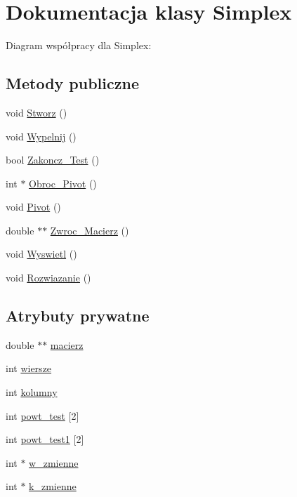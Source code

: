 \hypertarget{class_simplex}{\section{\-Dokumentacja klasy \-Simplex}
\label{class_simplex}
}


\-Diagram współpracy dla \-Simplex\-:
\subsection*{\-Metody publiczne}
\begin{DoxyCompactItemize}
\item 
void \hyperlink{class_simplex_aded4345510c78f73041c286fe4fc8e52}{\-Stworz} ()
\item 
void \hyperlink{class_simplex_a5b60e490fe0cebf26b08f1050ff54d03}{\-Wypelnij} ()
\item 
bool \hyperlink{class_simplex_ae4e0bb58320a4f10b9efe8faeaabbfbe}{\-Zakoncz\-\_\-\-Test} ()
\item 
int $\ast$ \hyperlink{class_simplex_afd2eb51388cd5055b6b1fa219435514b}{\-Obroc\-\_\-\-Pivot} ()
\item 
void \hyperlink{class_simplex_a5a5b218ab5c3d5bc74132c64d94421e6}{\-Pivot} ()
\item 
double $\ast$$\ast$ \hyperlink{class_simplex_af986941bf1abbc27a059a40ca2a9def2}{\-Zwroc\-\_\-\-Macierz} ()
\item 
void \hyperlink{class_simplex_ae8e7349892161f76863a27ada36d266a}{\-Wyswietl} ()
\item 
void \hyperlink{class_simplex_ad699adc1ea1428f8a8439e60a6d56703}{\-Rozwiazanie} ()
\end{DoxyCompactItemize}
\subsection*{\-Atrybuty prywatne}
\begin{DoxyCompactItemize}
\item 
double $\ast$$\ast$ \hyperlink{class_simplex_ae1aa6bc039eca109d9af4fc423a49510}{macierz}
\item 
int \hyperlink{class_simplex_a20249757e630443b5a5580c6e1787a5e}{wiersze}
\item 
int \hyperlink{class_simplex_ae237c38eca2984b94334ade925758eb9}{kolumny}
\item 
int \hyperlink{class_simplex_a106e79929804646eec2f30382195ee1a}{powt\-\_\-test} \mbox{[}2\mbox{]}
\item 
int \hyperlink{class_simplex_a5f74bdeb5992f39d279d7cd9a43b856b}{powt\-\_\-test1} \mbox{[}2\mbox{]}
\item 
int $\ast$ \hyperlink{class_simplex_a7e15401f583fe525e4ad3c6b4b78a7f5}{w\-\_\-zmienne}
\item 
int $\ast$ \hyperlink{class_simplex_a3a8d24917c4108603c676b2ffa67c689}{k\-\_\-zmienne}
\end{DoxyCompactItemize}



